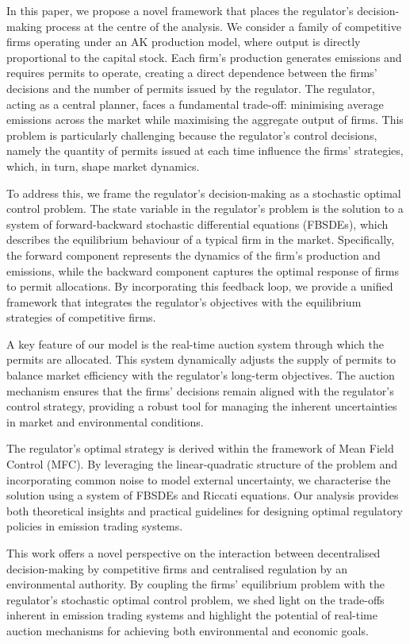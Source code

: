 \documentclass[11pt,twoside]{amsart}
\theoremstyle{definition}
\numberwithin{equation}{section}
\begin{document}
In this paper, we propose a novel framework that places the regulator’s decision-making process at the centre of the analysis. We consider a family of competitive firms operating under an AK production model, where output is directly proportional to the capital stock. Each firm’s production generates emissions and requires permits to operate, creating a direct dependence between the firms’ decisions and the number of permits issued by the regulator. The regulator, acting as a central planner, faces a fundamental trade-off: minimising average emissions across the market while maximising the aggregate output of firms. This problem is particularly challenging because the regulator’s control decisions, namely the quantity of permits issued at each time influence the firms’ strategies, which, in turn, shape market dynamics.

To address this, we frame the regulator’s decision-making as a stochastic optimal control problem. The state variable in the regulator’s problem is the solution to a system of forward-backward stochastic differential equations (FBSDEs), which describes the equilibrium behaviour of a typical firm in the market. Specifically, the forward component represents the dynamics of the firm’s production and emissions, while the backward component captures the optimal response of firms to permit allocations. By incorporating this feedback loop, we provide a unified framework that integrates the regulator’s objectives with the equilibrium strategies of competitive firms.

A key feature of our model is the real-time auction system through which the permits are allocated. This system dynamically adjusts the supply of permits to balance market efficiency with the regulator’s long-term objectives. The auction mechanism ensures that the firms’ decisions remain aligned with the regulator’s control strategy, providing a robust tool for managing the inherent uncertainties in market and environmental conditions.

The regulator’s optimal strategy is derived within the framework of Mean Field Control (MFC). By leveraging the linear-quadratic structure of the problem and incorporating common noise to model external uncertainty, we characterise the solution using a system of FBSDEs and Riccati equations. Our analysis provides both theoretical insights and practical guidelines for designing optimal regulatory policies in emission trading systems. 

This work offers a novel perspective on the interaction between decentralised decision-making by competitive firms and centralised regulation by an environmental authority. By coupling the firms’ equilibrium problem with the regulator’s stochastic optimal control problem, we shed light on the trade-offs inherent in emission trading systems and highlight the potential of real-time auction mechanisms for achieving both environmental and economic goals.
\end{document}
